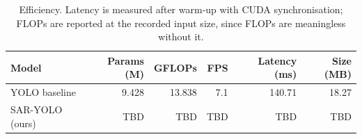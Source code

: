 \begin{table}[t]
\centering
\caption{Efficiency. Latency is measured after warm-up with CUDA synchronisation; FLOPs are reported at the recorded input size, since FLOPs are meaningless without it.}
\label{tab:efficiency}
\begin{tabular}{lrrrrr}
\toprule
Model & Params (M) & GFLOPs & FPS & Latency (ms) & Size (MB) \\
\midrule
YOLO baseline & 9.428 & 13.838 & 7.1 & 140.71 & 18.27 \\
SAR-YOLO (ours) & TBD & TBD & TBD & TBD & TBD \\
\bottomrule
\end{tabular}
\end{table}
